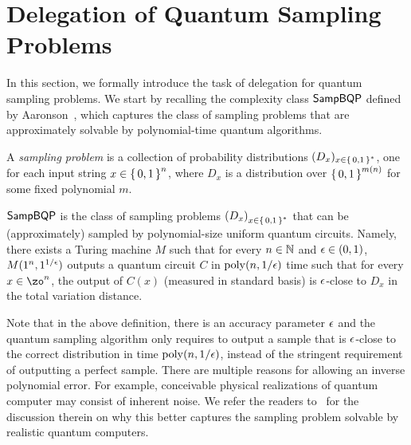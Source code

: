 \section{Delegation of Quantum Sampling Problems} \label{sec:samp_definition}

In this section, we formally introduce the task of delegation for quantum sampling problems. We start by recalling the complexity class $\SampBQP$ defined by Aaronson~\cite{aaronson_2013, aaronson_arkhipov_2011}, which captures the class of sampling problems that
are approximately solvable by polynomial-time quantum algorithms.


\begin{definition} 
    \label{dfn:sampling-problem}
    A \emph{sampling problem} is a collection of probability distributions $(D_x)_{x\in\set{0, 1}^*}$, one for each input string $x\in\set{0,1}^n$, where $D_x$ is a distribution over $\set{0,1}^{m(n)}$ for some fixed polynomial $m$.
\end{definition}

\begin{definition} [$\SampBQP$]
    $\SampBQP$ is the class of sampling problems $\left(D_x\right)_{x\in\set{0, 1}^*}$ that can be (approximately) sampled by polynomial-size uniform quantum circuits. Namely, there exists a Turing machine $M$ such that for every $n \in \mathbb{N}$ and $\epsilon \in (0,1)$, $M(1^n, 1^{1/\epsilon})$ outputs a quantum circuit $C$ in $\operatorname*{\operatorname{poly}}(n, 1/\epsilon)$ time such that for every $x \in \zo^n$, the output of $C(x)$ (measured in standard basis) is $\epsilon$-close to $D_x$ in the total variation distance. 
\end{definition}

Note that in the above definition, there is an accuracy parameter $\epsilon$ and the quantum sampling algorithm only requires to output a sample that is $\epsilon$-close to the correct distribution in time $\operatorname*{\operatorname{poly}}(n,1/\epsilon)$, instead of the stringent requirement of outputting a perfect sample. There are multiple reasons for allowing an inverse polynomial error. For example, conceivable physical realizations of quantum computer may consist of inherent noise. We refer the readers to~\cite{aaronson_2013, aaronson_arkhipov_2011} for the discussion therein on why this better captures the sampling problem solvable by realistic quantum computers. 

